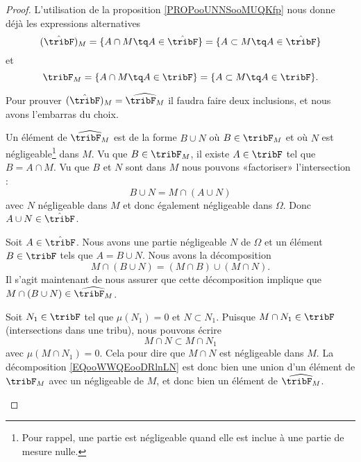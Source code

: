 \begin{proof}
	L'utilisation de la proposition \ref{PROPooUNNSooMUQKfp} nous donne déjà les expressions alternatives
	\begin{equation}
		(\hat\tribF)_M=\{ A\cap M\tq A\in\hat\tribF \}=\{ A\subset M\tq A\in\hat\tribF \}
	\end{equation}
	et
	\begin{equation}
		\tribF_M=\{ A\cap M\tq A\in\tribF \}=\{ A\subset M\tq A\in\tribF \}.
	\end{equation}

	Pour prouver \( (\hat\tribF)_M=\widehat{\tribF_M}\) il faudra faire deux inclusions, et nous avons l'embarras du choix.
	\begin{subproof}
		Un élément de \( \widehat{\tribF_M}\) est de la forme \( B\cup N\) où \( B\in \tribF_M\) et où \( N\) est négligeable\footnote{Pour rappel, une partie est négligeable quand elle est inclue à une partie de mesure nulle.} dans \( M\). Vu que \( B\in\tribF_M\), il existe \( A\in\tribF\) tel que \( B=A\cap M\). Vu que \( B\) et \( N\) sont dans \( M\) nous pouvons «factoriser» l'intersection :
		\begin{equation}
			B\cup N=M\cap (A\cup N)
		\end{equation}
		avec \( N\) négligeable dans \( M\) et donc également négligeable dans \( \Omega\). Donc \( A\cup N\in \hat\tribF\).


		Soit \( A\in\hat\tribF\). Nous avons une partie négligeable \( N\) de \( \Omega\) et un élément \( B\in \tribF\) tels que \( A=B\cup N\). Nous avons la décomposition
		\begin{equation}        \label{EQooWWQEooDRlnLN}
			M\cap(B\cup N)=(M\cap B)\cup(M\cap N).
		\end{equation}
		Il s'agit maintenant de nous assurer que cette décomposition implique que \( M\cap(B\cup N)\in \widehat{\tribF_M}\).

		Soit \( N_1\in \tribF\) tel que \( \mu(N_1)=0\) et \( N\subset N_1\). Puisque \( M\cap N_1\in \tribF\) (intersections dans une tribu), nous pouvons écrire
		\begin{equation}
			M\cap N\subset M\cap N_1
		\end{equation}
		avec \( \mu(M\cap N_1)=0\). Cela pour dire que \( M\cap N\) est négligeable dans \( M\). La décomposition \eqref{EQooWWQEooDRlnLN} est donc bien une union d'un élément de \( \tribF_M\) avec un négligeable de \( M\), et donc bien un élément de \( \widehat{\tribF_M}\).
	\end{subproof}
\end{proof}

